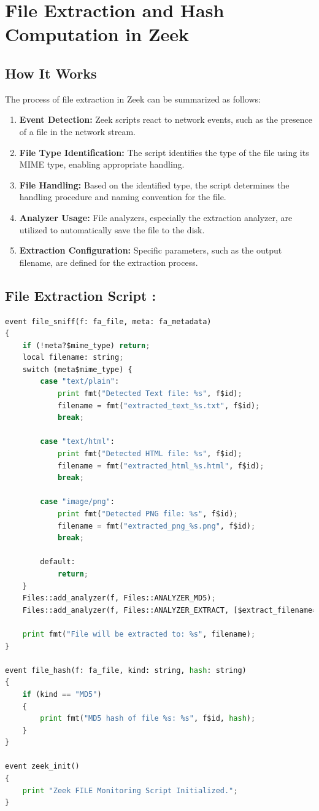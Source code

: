 \section{File Extraction and Hash Computation in Zeek}
\subsection{How It Works}
The process of file extraction in Zeek can be summarized as follows:
\begin{enumerate}
  \item \textbf{Event Detection:} Zeek scripts react to network events, such as the presence of a file in the network stream.
  \item \textbf{File Type Identification:} The script identifies the type of the file using its MIME type, enabling appropriate handling.
  \item \textbf{File Handling:} Based on the identified type, the script determines the handling procedure and naming convention for the file.
  \item \textbf{Analyzer Usage:} File analyzers, especially the extraction analyzer, are utilized to automatically save the file to the disk.
  \item \textbf{Extraction Configuration:} Specific parameters, such as the output filename, are defined for the extraction process.

\end{enumerate}

\subsection{File Extraction Script : }

\begin{lstlisting}[language=Python, caption= File EXtraction Script]
event file_sniff(f: fa_file, meta: fa_metadata)
{
    if (!meta?$mime_type) return;
    local filename: string;
    switch (meta$mime_type) {
        case "text/plain":
            print fmt("Detected Text file: %s", f$id);
            filename = fmt("extracted_text_%s.txt", f$id);
            break;
            
        case "text/html":
            print fmt("Detected HTML file: %s", f$id);
            filename = fmt("extracted_html_%s.html", f$id);
            break;
            
        case "image/png":
            print fmt("Detected PNG file: %s", f$id);
            filename = fmt("extracted_png_%s.png", f$id);
            break;

        default:
            return;
    }
    Files::add_analyzer(f, Files::ANALYZER_MD5);
    Files::add_analyzer(f, Files::ANALYZER_EXTRACT, [$extract_filename=filename]);
    
    print fmt("File will be extracted to: %s", filename);
}

event file_hash(f: fa_file, kind: string, hash: string)
{
    if (kind == "MD5")
    {
        print fmt("MD5 hash of file %s: %s", f$id, hash);
    }
}

event zeek_init()
{
    print "Zeek FILE Monitoring Script Initialized.";
}

\end{lstlisting}


